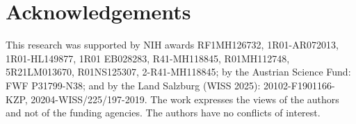 \section{Acknowledgements}

This research was supported by NIH awards RF1MH126732, 1R01-AR072013, 1R01-HL149877, 1R01 EB028283, R41-MH118845, R01MH112748, 5R21LM013670, R01NS125307, 2-R41-MH118845; by the Austrian Science Fund: FWF P31799-N38; and by the Land Salzburg (WISS 2025): 20102-F1901166-KZP, 20204-WISS/225/197-2019. The work expresses the views of the authors and not of the funding agencies. The authors have no conflicts of interest.


